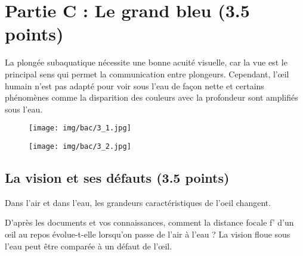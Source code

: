 \documentclass[answers]{exam}
\begin{document}
\section*{Partie C : Le grand bleu (3.5 points)}

La plongée subaquatique nécessite une bonne acuité visuelle, car la vue est le principal sens qui permet la communication entre plongeurs. Cependant, l'œil humain n'est pas adapté pour voir sous l'eau de façon nette et certains phénomènes comme la disparition des couleurs avec la profondeur sont amplifiés sous l'eau.

\begin{figure}[H]
  \centering
  \texttt{[image: img/bac/3\_1.jpg]}
\end{figure}

\begin{figure}[H]
  \centering
  \texttt{[image: img/bac/3\_2.jpg]}
\end{figure}

\subsection*{La vision et ses défauts (3.5 points)}

Dans l'air et dans l'eau, les grandeurs caractéristiques de l'oeil changent.

\begin{questions}
  \question[1] D'après les documents et vos connaissances, comment la distance focale f' d'un œil au repos évolue-t-elle lorsqu'on passe de l'air à l'eau ?
  \question[1.5] La vision floue sous l'eau peut être comparée à un défaut de l'œil.
\end{questions}
\end{document}
